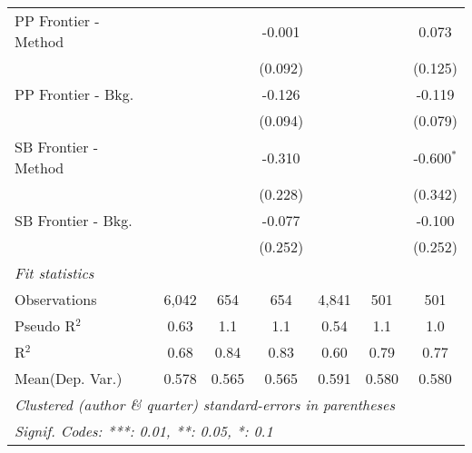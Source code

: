 \begin{tabular}{lcccccc}
   PP Frontier - Method &         &               & -0.001  &         &               & 0.073\\   
                        &         &               & (0.092) &         &               & (0.125)\\   
   PP Frontier - Bkg.   &         &               & -0.126  &         &               & -0.119\\   
                        &         &               & (0.094) &         &               & (0.079)\\   
   SB Frontier - Method &         &               & -0.310  &         &               & -0.600$^{*}$\\   
                        &         &               & (0.228) &         &               & (0.342)\\   
   SB Frontier - Bkg.   &         &               & -0.077  &         &               & -0.100\\   
                        &         &               & (0.252) &         &               & (0.252)\\   
   \midrule
   \emph{Fit statistics}\\
   Observations         & 6,042   & 654           & 654     & 4,841   & 501           & 501\\  
   Pseudo R$^2$         & 0.63    & 1.1           & 1.1     & 0.54    & 1.1           & 1.0\\  
   R$^2$                & 0.68    & 0.84          & 0.83    & 0.60    & 0.79          & 0.77\\  
Mean(Dep. Var.) & 0.578 & 0.565 & 0.565 & 0.591 & 0.580 & 0.580 \\
   \midrule \midrule
   \multicolumn{7}{l}{\emph{Clustered (author \& quarter) standard-errors in parentheses}}\\
   \multicolumn{7}{l}{\emph{Signif. Codes: ***: 0.01, **: 0.05, *: 0.1}}\\
\end{tabular}
\par\endgroup
